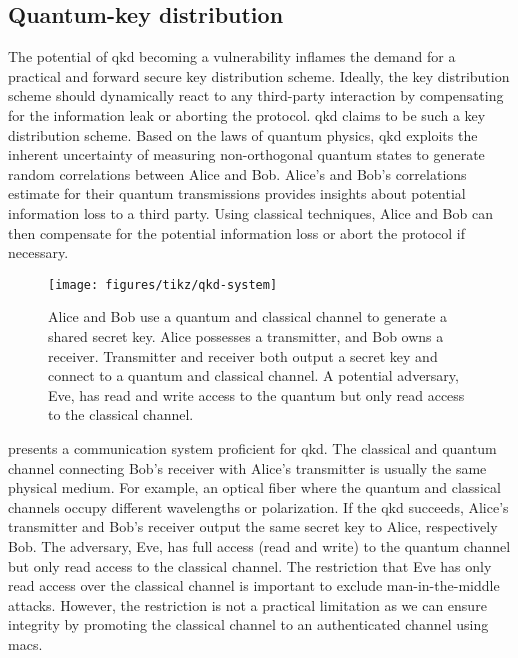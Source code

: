 \FloatBarrier
\subsection{Quantum-key distribution}

The potential of \gls{qkd} becoming a vulnerability inflames the demand for a practical and forward secure key distribution scheme.
Ideally, the key distribution scheme should dynamically react to any third-party interaction by compensating for the information leak or aborting the protocol.
\gls{qkd} claims to be such a key distribution scheme.
Based on the laws of quantum physics, \gls{qkd} exploits the inherent uncertainty of measuring non-orthogonal quantum states to generate random correlations between Alice and Bob.
Alice's and Bob's correlations estimate for their quantum transmissions provides insights about potential information loss to a third party.
Using classical techniques, Alice and Bob can then compensate for the potential information loss or abort the protocol if necessary.
\begin{figure}[htb]
	\centering
	\texttt{[image: figures/tikz/qkd-system]}
	\caption{Alice and Bob use a quantum and classical channel to generate a shared secret key. Alice possesses a transmitter, and Bob owns a receiver. Transmitter and receiver both output a secret key and connect to a quantum and classical channel. A potential adversary, Eve, has read and write access to the quantum but only read access to the classical channel.}\label{fig:qkd_system}
\end{figure}
 presents a communication system proficient for \gls{qkd}.
The classical and quantum channel connecting Bob's receiver with Alice's transmitter is usually the same physical medium.
For example, an optical fiber where the quantum and classical channels occupy different wavelengths or polarization.
If the \gls{qkd} succeeds, Alice's transmitter and Bob's receiver output the same secret key to Alice, respectively Bob.
The adversary, Eve, has full access (read and write) to the quantum channel but only read access to the classical channel.
The restriction that Eve has only read access over the classical channel is important to exclude man-in-the-middle attacks.
However, the restriction is not a practical limitation as we can ensure integrity by promoting the classical channel to an authenticated channel using \glspl{mac}.

